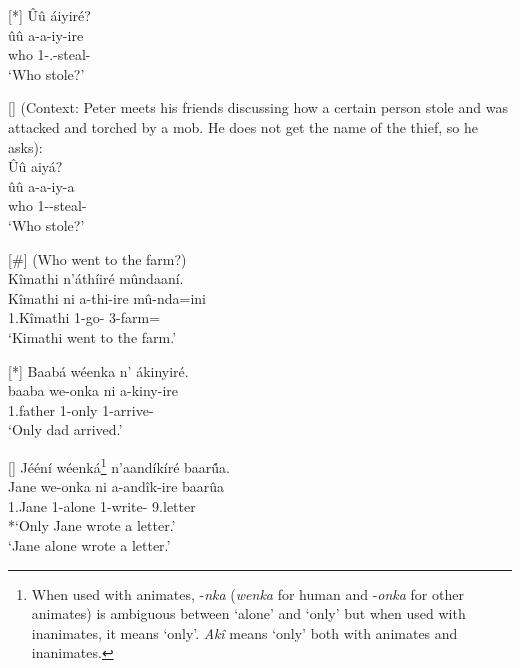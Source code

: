 \documentclass[output=paper]{langscibook}
\begin{document}
\ea
[*]{
\label{bkm:Ref64216844}
Ûû áiyiré?\\
\gll
ûû  a-a-iy-ire\\
who {1\SM-\N.\PST{}-steal-\PFV{}} \\
\glt
‘Who stole?’
}

\z

\ea
[]{
(Context: Peter meets his friends discussing how a certain person stole and was attacked and torched by a mob. He does not get the name of the thief, so he asks):\\
Ûû aiyá?\\
\gll
ûû  a-a-iy-a\\
who 1\SM-\PST{}-steal-\FV{}\\
\glt
‘Who stole\label{bkm:Ref90040976}?’
}

\z

\ea
[\#]{
\label{bkm:Ref94180218}
(Who went to the farm?)\\
Kîmathi n’áthíiré mûndaaní.\\
\gll
Kîmathi ni  a-thi-ire  mû-nda=ini\\
1.Kîmathi \FOC{}  1\SM{}-go-\PFV{} 3-farm=\LOC{}\\
\glt
‘Kimathi went to the farm.’
}

\z

\ea
[*]{
\label{bkm:Ref90041004}
Baabá wéenka n’ ákinyiré.\\
\gll
baaba  we-onka  ni  a-kiny-ire\\
1.father  1-only \FOC{} 1\SM{}-arrive-\PFV{} \\
\glt
‘Only dad arrived.’
}

\z

\ea
[]{
\label{bkm:Ref90041005}
Jééní wéenká\footnote{When used with animates, \mbox{-\textit{nka}} (\textit{wenka} for human and \mbox{-\textit{onka}} for other animates) is ambiguous between ‘alone’ and ‘only’ but when used with inanimates, it means ‘only’. \textit{Akî} means ‘only’ both with animates and inanimates.} n’aandíkíré baar\'{û}a.\\
\gll
Jane we-onka  ni  a-andîk-ire baarûa\\
1.Jane 1-alone \FOC{} 1\SM{}-write-\PFV{} 9.letter\\
\glt
*‘Only Jane wrote a letter.’\\
‘Jane alone wrote a letter.’
}
\end{document}
